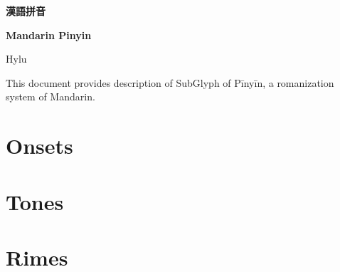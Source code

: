 \documentclass[12pt]{article}
\begin{document}

\begin{center}
    {\Huge \textbf{漢語拼音} \par}
    {\Huge \textbf{Mandarin Pinyin} \par}
    {\Large Hylu \par}
    \hrulefill
\end{center}

This document provides description of SubGlyph of Pīnyīn, a romanization system of Mandarin. \par

\section{Onsets}
%

\section{Tones}
%

\clearpage

\section{Rimes}
%
\end{document}
